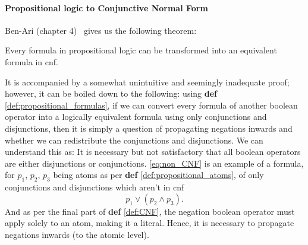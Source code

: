 \paragraph{Propositional logic to Conjunctive Normal Form}
Ben-Ari (chapter 4)~\cite{Math-Logic-for-CompSci} gives us the following theorem:
\begin{theorem}\label{thm:CNF_conversion}
    Every formula in propositional logic can be transformed into an equivalent formula in \acrshort{cnf}.
\end{theorem}
It is accompanied by a somewhat unintuitive and seemingly inadequate proof; however, it can be boiled down to the following: using \textbf{def} \ref{def:propositional_formulas}, if we can convert every formula of another boolean operator into a logically equivalent formula using only conjunctions and disjunctions, then it is simply a question of propagating negations inwards and whether we can redistribute the conjunctions and disjunctions. We can understand this as: It is necessary but not satisfactory that all boolean operators are either disjunctions or conjunctions. \autoref{eq:non_CNF} is an example of a formula, for \(p_1\), \(p_2\), \(p_3\) being atoms as per \textbf{def} \ref{def:propositional_atoms}, of only conjunctions and disjunctions which aren't in \acrshort{cnf}
\begin{equation}\label{eq:non_CNF}
    p_1 \vee (p_2 \wedge p_3).
\end{equation}
And as per the final part of \textbf{def} \ref{def:CNF}, the negation boolean operator must apply solely to an atom, making it a literal. Hence, it is necessary to propagate negations inwards (to the atomic level).
